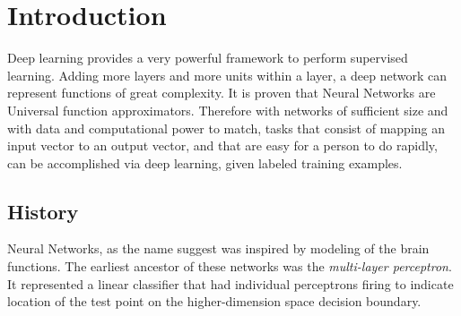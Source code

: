 
\chapter{Introduction} %

\label{intro} %



Deep learning provides a very powerful framework to perform supervised learning. Adding more layers and more units within a layer, a deep network can represent functions of great complexity. It is proven that Neural Networks are Universal function approximators. Therefore with networks of sufficient size and with data and computational power to match, tasks that consist of mapping an input vector to an output vector, and that are easy for a person to do rapidly, can be accomplished via deep learning, given labeled training examples.

\section*{History}
Neural Networks, as the name suggest was inspired by modeling of the brain functions. The earliest ancestor of these networks was the \textit{multi-layer perceptron}. It represented a linear classifier that had individual perceptrons firing to indicate location of the test point on the higher-dimension space decision boundary.



